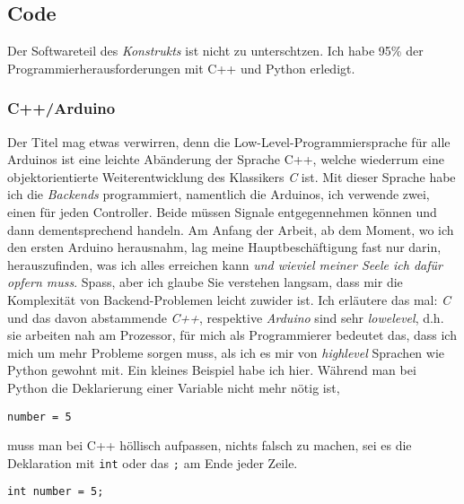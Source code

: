 \documentclass[12pt,titlepage,a4paper]{article}
\begin{document}
\subsection{Code}
Der Softwareteil des \textit{Konstrukts} ist nicht zu unterschtzen. Ich habe 95\% der Programmierherausforderungen mit C++ und Python erledigt.

\subsubsection{C++/Arduino}
Der Titel mag etwas verwirren, denn die Low-Level-Programmiersprache für alle Arduinos ist eine leichte Abänderung der Sprache C++, welche wiederrum eine objektorientierte Weiterentwicklung des Klassikers \textit{C} ist. Mit dieser Sprache habe ich die \textit{Backends} programmiert, namentlich die Arduinos, ich verwende zwei, einen für jeden Controller. Beide müssen Signale entgegennehmen können und dann dementsprechend handeln. Am Anfang der Arbeit, ab dem Moment, wo ich den ersten Arduino herausnahm, lag meine Hauptbeschäftigung fast nur darin, herauszufinden, was ich alles erreichen kann \textit{und wieviel meiner Seele ich dafür opfern muss}. Spass, aber ich glaube Sie verstehen langsam, dass mir die Komplexität von Backend-Problemen leicht zuwider ist. Ich erläutere das mal: \textit{C} und das davon abstammende \textit{C++}, respektive \textit{Arduino} sind sehr \textit{lowelevel}, d.h. sie arbeiten nah am Prozessor, für mich als Programmierer bedeutet das, dass ich mich um mehr Probleme sorgen muss, als ich es mir von \textit{highlevel} Sprachen wie Python gewohnt mit. Ein kleines Beispiel habe ich hier. Während man bei Python die Deklarierung einer Variable nicht mehr nötig ist,
\begin{verbatim}
number = 5
\end{verbatim}
muss man bei C++ höllisch aufpassen, nichts falsch zu machen, sei es die Deklaration mit \verb&int& oder das \verb&;& am Ende jeder Zeile.
\begin{verbatim}
int number = 5;
\end{verbatim}
\end{document}
